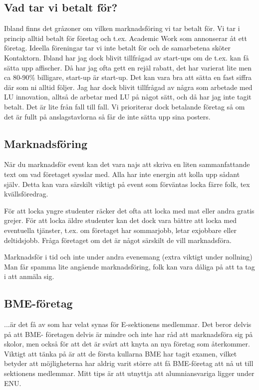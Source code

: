 \documentclass[10pt]{article}
\begin{document}
\subsection*{Vad tar vi betalt för?}
Ibland finns det gråzoner om vilken marknadsföring vi tar betalt för. Vi tar i princip alltid betalt för företag och t.ex. Academic Work som annonserar åt ett företag. Ideella föreningar tar vi inte betalt för och de samarbetena sköter Kontaktorn. Ibland har jag dock blivit tillfrågad av start-ups om de t.ex. kan få sätta upp affischer. Då har jag ofta gett en rejäl rabatt, det har varierat lite men ca 80-90\% billigare, start-up är start-up. Det kan vara bra att sätta en fast siffra där som ni alltid följer. Jag har dock blivit tillfrågad av några som arbetade med LU innovation, alltså de arbetar med LU på något sätt, och då har jag inte tagit betalt. Det är lite från fall till fall. Vi prioriterar dock betalande företag så om det är fullt på anslagstavlorna så får de inte sätta upp sina posters.

\subsection*{Marknadsföring}
När du marknadsför event kan det vara najs att skriva en liten sammanfattande text om vad företaget sysslar med. Alla har inte energin att kolla upp sådant själv. Detta kan vara särskilt viktigt på event som förväntas locka färre folk, tex kvällsföredrag.

För att locka yngre studenter räcker det ofta att locka med mat eller andra gratis grejer. För att locka äldre studenter kan det dock vara bättre att locka med eventuella tjänster, t.ex. om företaget har sommarjobb, letar exjobbare eller deltidsjobb.
Fråga företaget om det är något särskilt de vill marknadsföra.

Marknadsför i tid och inte under andra evenemang (extra viktigt under nollning)
Man får spamma lite angående marknadsföring, folk kan vara dåliga på att ta tag i att anmäla sig.

\subsection*{BME-företag}
...är det få av som har velat synas för E-sektionens medlemmar. Det beror delvis på att BME-
företagen delvis är mindre och inte har råd att marknadsföra sig på skolor, men också för att det är svårt att knyta an nya företag som återkommer. Viktigt att tänka på är att de första kullarna BME har tagit examen, vilket betyder att möjligheterna har aldrig varit större att få BME-företag att nå ut till sektionens medlemmar. Mitt tips är att utnyttja att alumniansvariga ligger under ENU.
\end{document}
